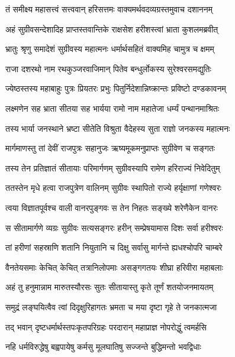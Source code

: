 
\twolineshloka
{तं समीक्ष्य महासत्त्वं सत्त्ववान् हरिसत्तमः}
{वाक्यमर्थवदव्यग्रस्तमुवाच दशाननम्} %

\twolineshloka
{अहं सुग्रीवसन्देशादिह प्राप्तस्तवान्तिके}
{राक्षसेश हरीशस्त्वां भ्राता कुशलमब्रवीत्} %

\twolineshloka
{भ्रातुः श्रृणु समादेशं सुग्रीवस्य महात्मनः}
{धर्मार्थसहितं वाक्यमिह चामुत्र च क्षमम्} %

\twolineshloka
{राजा दशरथो नाम रथकुञ्जरवाजिमान्}
{पितेव बन्धुर्लोकस्य सुरेश्वरसमद्युतिः} %

\twolineshloka
{ज्येष्ठस्तस्य महाबाहुः पुत्रः प्रियतरः प्रभुः}
{पितुर्निदेशान्निष्क्रान्तः प्रविष्टो दण्डकावनम्} %

\twolineshloka
{लक्ष्मणेन सह भ्राता सीतया सह भार्यया}
{रामो नाम महातेजा धर्म्यं पन्थानमाश्रितः} %

\twolineshloka
{तस्य भार्या जनस्थाने भ्रष्टा सीतेति विश्रुता}
{वैदेहस्य सुता राज्ञो जनकस्य महात्मनः} %

\twolineshloka
{मार्गमाणस्तु तां देवीं राजपुत्रः सहानुजः}
{ऋष्यमूकमनुप्राप्तः सुग्रीवेण च सङ्गतः} %

\twolineshloka
{तस्य तेन प्रतिज्ञातं सीतायाः परिमार्गणम्}
{सुग्रीवस्यापि रामेण हरिराज्यं निवेदितुम्} %

\twolineshloka
{ततस्तेन मृधे हत्वा राजपुत्रेण वालिनम्}
{सुग्रीवः स्थापितो राज्ये हर्यृक्षाणां गणेश्वरः} %

\twolineshloka
{त्वया विज्ञातपूर्वश्च वाली वानरपुङ्गवः}
{स तेन निहतः सङ्ख्ये शरेणैकेन वानरः} %

\twolineshloka
{स सीतामार्गणे व्यग्रः सुग्रीवः सत्यसङ्गरः}
{हरीन् सम्प्रेषयामास दिशः सर्वा हरीश्वरः} %

\twolineshloka
{तां हरीणां सहस्राणि शतानि नियुतानि च}
{दिक्षु सर्वासु मार्गन्ते ह्यधश्चोपरि चाम्बरे} %

\twolineshloka
{वैनतेयसमाः केचित् केचित् तत्रानिलोपमाः}
{असङ्गगतयः शीघ्रा हरिवीरा महाबलाः} %

\twolineshloka
{अहं तु हनुमान्नाम मारुतस्यौरसः सुतः}
{सीतायास्तु कृते तूर्णं शतयोजनमायतम्} %

\twolineshloka
{समुद्रं लङ्घयित्वैव त्वां दिदृक्षुरिहागतः}
{भ्रमता च मया दृष्टा गृहे ते जनकात्मजा} %

\twolineshloka
{तद् भवान् दृष्टधर्मार्थस्तपःकृतपरिग्रहः}
{परदारान् महाप्राज्ञ नोपरोद्धुं त्वमर्हसि} %

\twolineshloka
{नहि धर्मविरुद्धेषु बह्वपायेषु कर्मसु}
{मूलघातिषु सज्जन्ते बुद्धिमन्तो भवद्विधाः} %

